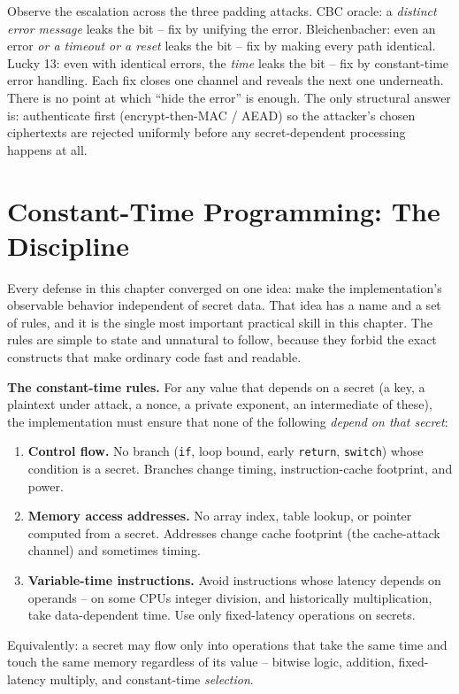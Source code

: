 \begin{trapbox}
Observe the escalation across the three padding attacks. CBC oracle: a \emph{distinct error message} leaks the bit -- fix by unifying the error. Bleichenbacher: even an error \emph{or a timeout or a reset} leaks the bit -- fix by making every path identical. Lucky 13: even with identical errors, the \emph{time} leaks the bit -- fix by constant-time error handling. Each fix closes one channel and reveals the next one underneath. There is no point at which ``hide the error'' is enough. The only structural answer is: authenticate first (encrypt-then-MAC / AEAD) so the attacker's chosen ciphertexts are rejected uniformly before any secret-dependent processing happens at all.
\end{trapbox}

\section{Constant-Time Programming: The Discipline}
\label{ch37:ct-discipline}

Every defense in this chapter converged on one idea: make the implementation's observable behavior independent of secret data. That idea has a name and a set of rules, and it is the single most important practical skill in this chapter. The rules are simple to state and unnatural to follow, because they forbid the exact constructs that make ordinary code fast and readable.

\begin{formalbox}
\textbf{The constant-time rules.} For any value that depends on a secret (a key, a plaintext under attack, a nonce, a private exponent, an intermediate of these), the implementation must ensure that none of the following \emph{depend on that secret}:
\begin{enumerate}
\item \textbf{Control flow.} No branch (\texttt{if}, loop bound, early \texttt{return}, \texttt{switch}) whose condition is a secret. Branches change timing, instruction-cache footprint, and power.
\item \textbf{Memory access addresses.} No array index, table lookup, or pointer computed from a secret. Addresses change cache footprint (the cache-attack channel) and sometimes timing.
\item \textbf{Variable-time instructions.} Avoid instructions whose latency depends on operands -- on some CPUs integer division, and historically multiplication, take data-dependent time. Use only fixed-latency operations on secrets.
\end{enumerate}
Equivalently: a secret may flow only into operations that take the same time and touch the same memory regardless of its value -- bitwise logic, addition, fixed-latency multiply, and constant-time \emph{selection}.
\end{formalbox}

